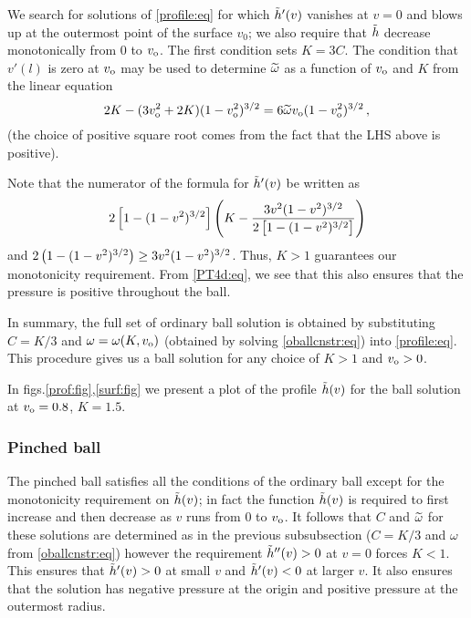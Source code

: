 We search for solutions of \eqref{profile:eq} for which $\tilde h'(v)$
vanishes at $v=0$ and blows up at the outermost point of the surface
$v_0$; we also require that $\tilde h$ decrease monotonically from $0$ to
$v_\mathrm{o}$. The first condition sets $K=3C$.  The condition that $v'(l)$
is zero at $v_\mathrm{o}$ may be used to determine $\widetilde{\omega}$ as a function of
$v_\mathrm{o}$ and $K$ from the linear equation
\begin{equation}\label{oballcnstr:eq}
  2K - (3v_\mathrm{o}^2+2K)(1-v_\mathrm{o}^2)^{3/2} = 6\widetilde{\omega}v_\mathrm{o}(1-v_\mathrm{o}^2)^{3/2} \,,
\end{equation}
%
(the choice of positive square root comes from the fact that the LHS
above is positive).

Note that the numerator of the formula for $\tilde h'(v)$ be written as
%
\begin{equation*}
  2\left [ 1-(1-v^2)^{3/2} \right ]\left ( K-\frac{3v^2(1-v^2)^{3/2}}{2\left [ 1-(1-v^2)^{3/2} \right ]} \right )
\end{equation*}
%
and $2\left ( 1-(1-v^2)^{3/2} \right )\geq3v^2(1-v^2)^{3/2}$. Thus, $K>1$
guarantees our monotonicity requirement. From \eqref{PT4d:eq}, we
see that this also ensures that the pressure is positive throughout
the ball.

In summary, the full set of ordinary ball solution is obtained by
substituting $C=K/3$ and $\omega= \omega(K, v_\mathrm{o})$ (obtained by
solving \eqref{oballcnstr:eq}) into \eqref{profile:eq}. This
procedure gives us a ball solution for any choice of $K>1$ and
$v_\mathrm{o}>0$.

In figs.\ref{prof:fig},\ref{surf:fig} we present a plot of the profile $\tilde h(v)$ for
the ball solution at $v_\mathrm{o}=0.8$, $K=1.5$.


\subsubsection{Pinched ball}\label{sec:pball4d}

The pinched ball satisfies all the conditions of the ordinary ball
except for the monotonicity requirement on $\tilde h(v)$; in fact the
function $\tilde h(v)$ is required to first increase and then decrease as
$v$ runs from $0$ to $v_\mathrm{o}$. It follows that $C$ and $\widetilde{\omega}$ for these
solutions are determined as in the previous subsubsection ($C=K/3$
and $\omega $ from \eqref{oballcnstr:eq}) however the requirement
$\tilde h''(v)>0$ at $v=0$ forces $K<1$. This ensures that $\tilde h'(v)>0$ at
small $v$ and $\tilde h'(v)<0$ at larger $v$. It also ensures that the
solution has negative pressure at the origin and positive pressure
at the outermost radius.

